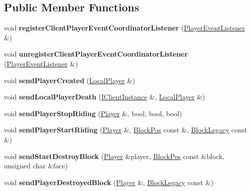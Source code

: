 \subsection*{Public Member Functions}
\begin{DoxyCompactItemize}
\item 
\mbox{\label{struct_client_player_event_coordinator_a0f52c211392be7cc0e7c0ea27c495e24}} 
void {\bfseries register\+Client\+Player\+Event\+Coordinator\+Listener} (\mbox{\hyperlink{class_player_event_listener}{Player\+Event\+Listener}} \&)
\item 
\mbox{\label{struct_client_player_event_coordinator_a30a68e518eb36fd67eac1c5f0837a8d8}} 
void {\bfseries unregister\+Client\+Player\+Event\+Coordinator\+Listener} (\mbox{\hyperlink{class_player_event_listener}{Player\+Event\+Listener}} \&)
\item 
\mbox{\label{struct_client_player_event_coordinator_ad5d864f72ff7f83486a9c9c61bede011}} 
void {\bfseries send\+Player\+Created} (\mbox{\hyperlink{class_local_player}{Local\+Player}} \&)
\item 
\mbox{\label{struct_client_player_event_coordinator_a3f9029e8703fbbd7d8dbca82809a789d}} 
void {\bfseries send\+Local\+Player\+Death} (\mbox{\hyperlink{class_i_client_instance}{I\+Client\+Instance}} \&, \mbox{\hyperlink{class_local_player}{Local\+Player}} \&)
\item 
\mbox{\label{struct_client_player_event_coordinator_aee5d040c9d1e1c2fae7d30ae25738b0d}} 
void {\bfseries send\+Player\+Stop\+Riding} (\mbox{\hyperlink{struct_player}{Player}} \&, bool, bool, bool)
\item 
\mbox{\label{struct_client_player_event_coordinator_a7d68506745f7867695efad53194542ed}} 
void {\bfseries send\+Player\+Start\+Riding} (\mbox{\hyperlink{struct_player}{Player}} \&, \mbox{\hyperlink{struct_block_pos}{Block\+Pos}} const \&, \mbox{\hyperlink{class_block_legacy}{Block\+Legacy}} const \&)
\item 
\mbox{\label{struct_client_player_event_coordinator_ad6c8cc5ccb08ca34ac1bc2cc144c67ff}} 
void {\bfseries send\+Start\+Destroy\+Block} (\mbox{\hyperlink{struct_player}{Player}} \&player, \mbox{\hyperlink{struct_block_pos}{Block\+Pos}} const \&block, unsigned char \&face)
\item 
\mbox{\label{struct_client_player_event_coordinator_aeeac18f5207bd2c9fa4676f647c7e524}} 
void {\bfseries send\+Player\+Destroyed\+Block} (\mbox{\hyperlink{struct_player}{Player}} \&, \mbox{\hyperlink{class_block_legacy}{Block\+Legacy}} const \&)
\end{DoxyCompactItemize}


